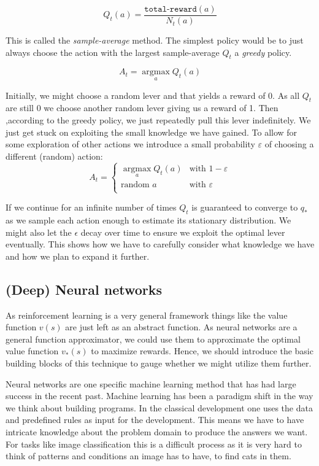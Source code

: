 $$
    Q_t(a) = \frac{\texttt{total-reward}(a)}{N_t(a)}
$$

This is called the \textit{sample-average} method. The simplest policy would be to just always choose the action with the largest sample-average $ Q_t $ a \textit{greedy} policy.

$$
    A_t = \operatorname*{argmax}_a Q_t(a)
$$

Initially, we might choose a random lever and that yields a reward of 0. As all $ Q_t $ are still 0 we choose another random lever giving us a reward of 1. Then ,according to the greedy policy, we just repeatedly pull this lever indefinitely. We just get stuck on exploiting the small knowledge we have gained. To allow for some exploration of other actions we introduce a small probability $\varepsilon $ of choosing a different (random) action:
$$
    A_t =
    \begin{cases}
        \operatorname*{argmax}_a Q_t(a) & \text{with } 1 - \varepsilon \\
        \text{random } a                & \text{with }  \varepsilon    \\
    \end{cases}
$$

If we continue for an infinite number of times $ Q_t $ is guaranteed to converge to $ q_{*} $ as we sample each action enough to estimate its stationary distribution. We might also let the $ \epsilon $ decay over time to ensure we exploit the optimal lever eventually. This shows how we have to carefully consider what knowledge we have and how we plan to expand it further.

\subsection{(Deep) Neural networks}
\label{neural_networks}
As reinforcement learning is a very general framework things like the value function $ v(s)$ are just left as an abstract function. As neural networks are a general function approximator, we could use them to approximate the optimal value function $ v_{*}(s) $ to maximize rewards. Hence, we should introduce the basic building blocks of this technique to gauge whether we might utilize them further.

Neural networks are one specific machine learning method that has had large success in the recent past. Machine learning has been a paradigm shift in the way we think about building programs. In the classical development one uses the data and predefined rules as input for the development. This means we have to have intricate knowledge about the problem domain to produce the answers we want. For tasks like image classification this is a difficult process as it is very hard to think of patterns and conditions an image has to have, to find cats in them.

